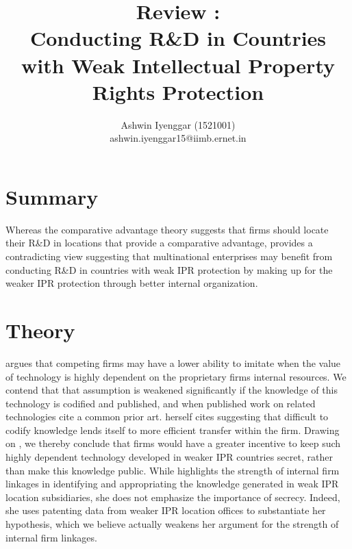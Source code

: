 \documentclass[12pt]{article}
\begin{document}
\title{Review  : \cite{Zhao2006}\\Conducting R\&D in Countries with Weak Intellectual Property Rights Protection}
\author{Ashwin Iyenggar  (1521001) \\ ashwin.iyenggar15@iimb.ernet.in} 


\maketitle
\thispagestyle{empty}

\section{Summary}
Whereas the comparative advantage theory suggests that firms should locate their R\&D in locations that provide a comparative advantage, \cite{Zhao2006} provides a contradicting view suggesting that multinational enterprises may benefit from conducting R\&D in countries with weak IPR protection by  making up for the weaker IPR protection through better internal organization.

\section{Theory}
\cite{Zhao2006} argues that competing firms may have a lower ability to imitate when the value of technology is highly dependent on the proprietary firm\textquotesingle s internal resources. We contend that that assumption is weakened significantly if the knowledge of this technology is codified and published, and when published work on related technologies cite a common prior art. \cite{Zhao2006} herself cites \cite{Kogut1993} suggesting that difficult to codify knowledge lends itself to more efficient transfer within the firm. Drawing on \cite{Cohen2000}, we thereby conclude that firms would have a greater incentive to keep such highly dependent technology developed in weaker IPR countries secret, rather than make this knowledge public. While \cite{Zhao2006} highlights the strength of internal firm linkages in identifying and appropriating the knowledge generated in weak IPR location subsidiaries, she does not emphasize the importance of secrecy. Indeed, she uses patenting data from weaker IPR location offices to substantiate her hypothesis, which we believe actually weakens her argument for the strength of internal firm linkages.
\end{document}
